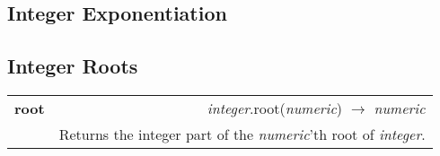 \documentclass[pdftex,10pt]{article}
\newlength{\methwidth}
\newlength{\defnwidth}
\begin{document}
\subsection{Integer Exponentiation}

\subsection{Integer Roots}

\begin{tabular}{p{\methwidth} l r}
\toprule
\textbf{root} & & \textit{integer}.root(\textit{numeric}) $\rightarrow$ \textit{numeric} \\
\cmidrule(r){2-3}
& \multicolumn{2}{p{\defnwidth}}{
  Returns the integer part of the \textit{numeric}'th root of \textit{integer}.
}
\end{tabular}
\end{document}
